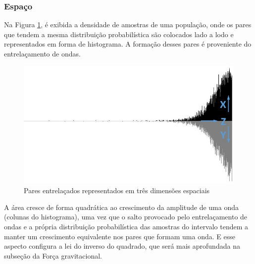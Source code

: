 \subsubsection{Espaço}
Na Figura \ref{fig:consciousness_space_waves}, é exibida a densidade de amostras de uma população, onde os pares que tendem a mesma distribuição probabilística são colocados lado a lodo e representados em forma de histograma. A formação desses pares é proveniente do entrelaçamento de ondas.
	\begin{figure}[H]
	\caption{Pares entrelaçados representados em três dimensões espaciais}
	\label{fig:consciousness_space_waves}
	\centering
	\includegraphics[scale=.7]{sections/images/consciousness_space_waves.jpg}
	\end{figure}

A área cresce de forma quadrática ao crescimento da amplitude de uma onda (colunas do histograma), uma vez que o salto provocado pelo entrelaçamento de ondas e a própria distribuição probabilística das amostras do intervalo tendem a manter um crescimento equivalente nos pares que formam uma onda. E esse aspecto configura a lei do inverso do quadrado, que será mais aprofundada na subseção da Força gravitacional.

